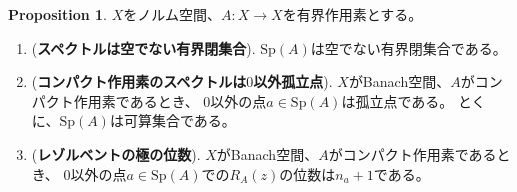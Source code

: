 \documentclass[uplatex]{jsarticle}
\theoremstyle{definition}
\newtheorem{prop}[prop]{Proposition}
\newcommand{\spectm}{\mathrm{Sp}}
\begin{document}
\begin{prop}
  \label{spectm top}
  \(X\)をノルム空間、\(A:X\to X\)を有界作用素とする。
  \begin{enumerate}
    \item \label{spectm cpt}
    (\textbf{スペクトルは空でない有界閉集合}).
    \(\spectm(A)\)は空でない有界閉集合である。
    \item \label{cpt op spectm disc}
    (\textbf{コンパクト作用素のスペクトルは\(0\)以外孤立点}).
    \(X\)がBanach空間、\(A\)がコンパクト作用素であるとき、
    \(0\)以外の点\(a\in \spectm(A)\)は孤立点である。
    とくに、\(\spectm(A)\)は可算集合である。
    \item \label{resolv pole}
    (\textbf{レゾルベントの極の位数}).
    \(X\)がBanach空間、\(A\)がコンパクト作用素であるとき、
    \(0\)以外の点\(a\in \spectm(A)\)での\(R_A(z)\)の位数は\(n_a+1\)である。
  \end{enumerate}
\end{prop}
\end{document}

